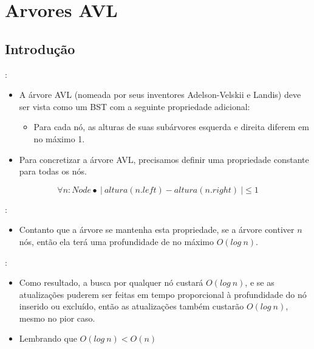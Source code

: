 \section{Arvores AVL}
\subsection{Introdução}
\begin{frame}{\secname : \subsecname}

  \begin{itemize}
  \item A árvore AVL (nomeada por seus inventores Adelson-Velskii e Landis) deve 
  ser vista como um BST com a seguinte propriedade adicional: 
  \begin{itemize}
  \item Para cada nó, as alturas de suas subárvores esquerda e direita diferem em no máximo 1.
  \end{itemize}
  \item Para concretizar a árvore AVL, precisamos definir uma propriedade 
  constante para todas os nós.
\end{itemize}
\begin{equation}
\forall n: Node \bullet~|~altura(n.left) - altura(n.right)~| \leq 1
\end{equation}

  
\end{frame}

\begin{frame}{\secname : \subsecname}

  \begin{itemize}
  \item Contanto que a árvore se mantenha esta propriedade, se a árvore contiver $n$ 
  nós, então ela terá uma profundidade de no máximo $O (log~n)$. 
  \end{itemize}
\end{frame}
\begin{frame}{\secname : \subsecname}
  \begin{itemize}

  \item Como resultado, a busca por qualquer nó custará $O (log~n)$, e 
  se as atualizações puderem ser feitas em tempo proporcional à profundidade 
  do nó inserido ou excluído, então as atualizações também 
  custarão $O (log~n)$, mesmo no pior caso.
  \item Lembrando que $O (log~n) < O (n)$ 
  \end{itemize}
\end{frame}
